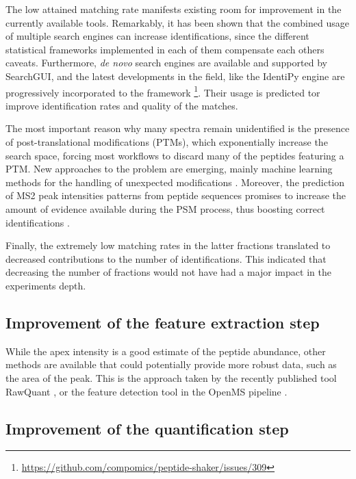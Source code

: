 \documentclass[11pt, a4paper]{report}
\begin{document}
The low attained matching rate manifests existing room for improvement in the currently available tools. Remarkably, it has been shown that the combined usage of multiple search engines can increase identifications, since the different statistical frameworks implemented in each of them compensate each other\textquotesingle s caveats. Furthermore, \textit{de novo} search engines are available and supported by SearchGUI, and the latest developments in the field, like the IdentiPy engine \cite{Levitsky2018} are progressively incorporated to the framework \footnote{\href{https://github.com/compomics/peptide-shaker/issues/309}{https://github.com/compomics/peptide-shaker/issues/309}}. Their usage is predicted tor improve identification rates and quality of the matches.

The most important reason why many spectra remain unidentified is the presence of post-translational modifications (\ac{PTM}s), which exponentially increase the search space, forcing most workflows to discard many of the peptides featuring a PTM. New approaches to the problem are emerging, mainly machine learning methods for the handling of unexpected modifications \cite{Gabriels}. Moreover, the prediction of \ac{MS2} peak intensities patterns from peptide sequences promises to increase the amount of evidence available during the PSM process, thus boosting correct identifications \cite{Kirik2018} \cite{Degroeve2013}.

Finally, the extremely low matching rates in the latter fractions translated to decreased contributions to the number of identifications. This indicated that decreasing the number of fractions would not have had a major impact in the experiment\textquotesingle s depth.



\subsection{Improvement of the feature extraction step}

While the apex intensity is a good estimate of the peptide abundance, other methods are available that could potentially provide more robust data, such as the area of the peak. This is the approach taken by the recently published tool RawQuant \cite{Kovalchik2018}, or the feature detection tool in the OpenMS pipeline \cite{Sturm2008}. 

\subsection{Improvement of the quantification step}
\end{document}

